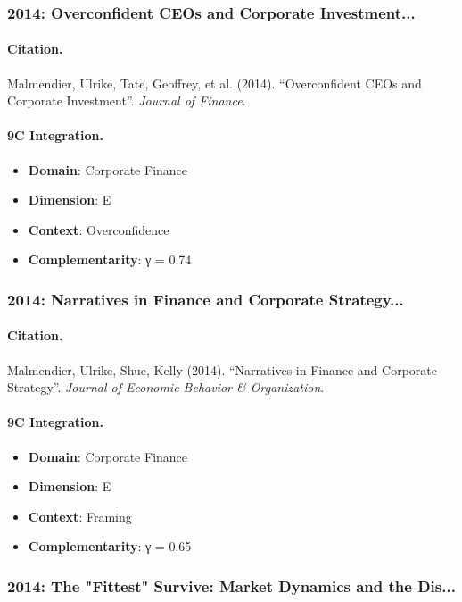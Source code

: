 \subsubsection{2014: Overconfident CEOs and Corporate Investment...}

\paragraph{Citation.}
Malmendier, Ulrike, Tate, Geoffrey, et al. (2014). ``Overconfident CEOs and Corporate Investment''. \textit{Journal of Finance}.

\paragraph{9C Integration.}
\begin{itemize}[nosep]
  \item \textbf{Domain}: Corporate Finance
  \item \textbf{Dimension}: E
  \item \textbf{Context}: Overconfidence
  \item \textbf{Complementarity}: γ = 0.74
\end{itemize}


\subsubsection{2014: Narratives in Finance and Corporate Strategy...}

\paragraph{Citation.}
Malmendier, Ulrike, Shue, Kelly (2014). ``Narratives in Finance and Corporate Strategy''. \textit{Journal of Economic Behavior & Organization}.

\paragraph{9C Integration.}
\begin{itemize}[nosep]
  \item \textbf{Domain}: Corporate Finance
  \item \textbf{Dimension}: E
  \item \textbf{Context}: Framing
  \item \textbf{Complementarity}: γ = 0.65
\end{itemize}


\subsubsection{2014: The "Fittest" Survive: Market Dynamics and the Dis...}

